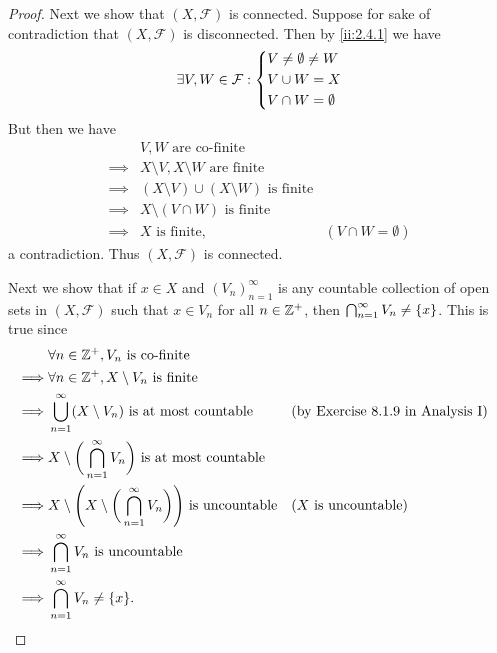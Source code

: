 \begin{proof}
  Next we show that \((X, \mathcal{F})\) is connected.
  Suppose for sake of contradiction that \((X, \mathcal{F})\) is disconnected.
  Then by \cref{ii:2.4.1} we have
  \[
    \exists V, W \in \mathcal{F} : \begin{dcases}
      V \neq \emptyset \neq W \\
      V \cup W = X            \\
      V \cap W = \emptyset
    \end{dcases}
  \]
  But then we have
  \begin{align*}
             & V, W \text{ are co-finite}                                                      \\
    \implies & X \setminus V, X \setminus W \text{ are finite}                                 \\
    \implies & (X \setminus V) \cup (X \setminus W) \text{ is finite}                          \\
    \implies & X \setminus (V \cap W) \text{ is finite}                                        \\
    \implies & X \text{ is finite},                                   & (V \cap W = \emptyset)
  \end{align*}
  a contradiction.
  Thus \((X, \mathcal{F})\) is connected.

  Next we show that if \(x \in X\) and \((V_n)_{n = 1}^\infty\) is any countable collection of open sets in \((X, \mathcal{F})\) such that \(x \in V_n\) for all \(n \in \mathbb{Z}^+\), then \(\bigcap_{n = 1}^\infty V_n \neq \left\lbrace x\right\rbrace\).
  This is true since
  \begin{align*}
             & \forall n \in \Z^+, V_n \text{ is co-finite}                                                                                                    \\
    \implies & \forall n \in \Z^+, X \setminus V_n \text{ is finite}                                                                                           \\
    \implies & \bigcup_{n = 1}^\infty (X \setminus V_n) \text{ is at most countable}                             &  & \text{(by Exercise 8.1.9 in Analysis I)} \\
    \implies & X \setminus \bigg(\bigcap_{n = 1}^\infty V_n\bigg) \text{ is at most countable}                                                                 \\
    \implies & X \setminus \Bigg(X \setminus \bigg(\bigcap_{n = 1}^\infty V_n\bigg)\Bigg) \text{ is uncountable} &  & \text{(\(X\) is uncountable)}            \\
    \implies & \bigcap_{n = 1}^\infty V_n \text{ is uncountable}                                                                                               \\
    \implies & \bigcap_{n = 1}^\infty V_n \neq \set{x}.
  \end{align*}


\end{proof}

